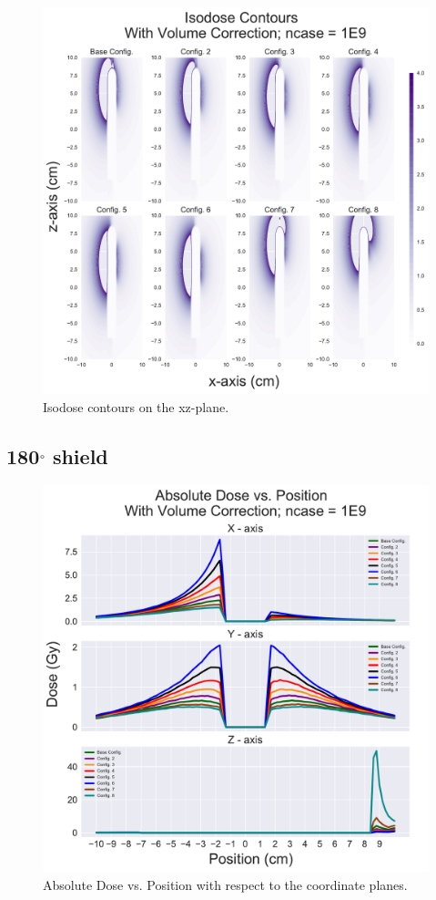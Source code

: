\documentclass[12pt]{article}
\begin{document}
\begin{figure}[!ht]
	\centering
	\includegraphics[scale=0.6]{xz_isodose_profiles_90Shield}
	\caption{Isodose contours on the xz-plane.}
\end{figure}

\FloatBarrier

\subsection{180$\degree$ shield}

\begin{figure}[!ht]
	\centering
	\includegraphics[scale=0.6]{dosage_comparison_180Shield}
	\caption{Absolute Dose vs. Position with respect to the coordinate planes.}
\end{figure}
\end{document}
